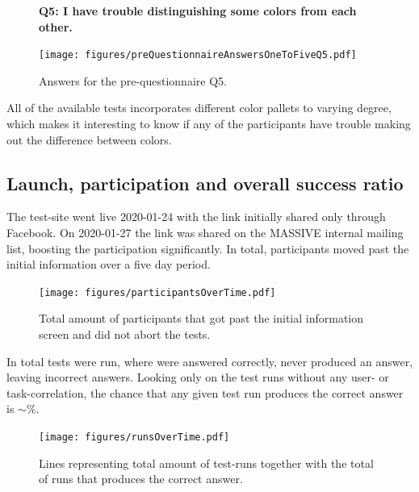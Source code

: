 \documentclass[nofilelist,dvipsnames]{cslthse-msc}
\begin{document}
				\begin{figure}[h!]
          \textbf{Q5: I have trouble distinguishing some colors from each other.}
          \begin{center}
            \texttt{[image: figures/preQuestionnaireAnswersOneToFiveQ5.pdf]}
            \vspace{-1cm}
            \caption{Answers for the pre-questionnaire Q5.}
            \vspace{-0.4cm}
          \end{center}
				\end{figure}

        All of the available tests incorporates different color pallets to
        varying degree, which makes it interesting to know if any of the
        participants have trouble making out the difference between colors.
        \vspace{-0.6cm}

			\subsection{Launch, participation and overall success ratio}

        The test-site went live 2020-01-24 with the link initially shared only
        through Facebook. On 2020-01-27 the link was shared on the MASSIVE
        internal mailing list, boosting the participation significantly.
        In total,  participants moved past the
        initial information over a five day period.

				\begin{figure}[h!]
					\centering
					\texttt{[image: figures/participantsOverTime.pdf]}
          \vspace{-0.3cm}
          \caption{
            Total amount of participants that got past the initial
            information screen and did not abort the tests.
          }
				\end{figure}

				In total  tests were run, where
				 were answered correctly,
				 never produced an answer, leaving
				 incorrect answers. Looking only on the test
				runs without any user- or task-correlation, the chance that any given test run
				produces the correct answer is $\sim$\%.

				\begin{figure}[h!]
					\centering
					\texttt{[image: figures/runsOverTime.pdf]}
          \vspace{-0.3cm}
          \caption{Lines representing total amount of test-runs together with
            the total of runs that produces the correct answer.}
          \vspace{-0.4cm}
				\end{figure}
\end{document}

